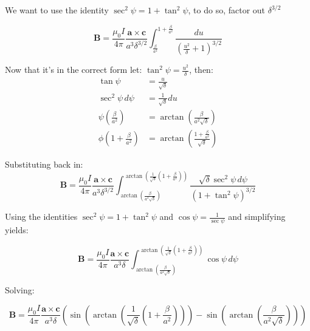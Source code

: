 We want to use the identity $\sec^2\psi = 1 + \tan^2\psi$, to do so, factor out $\delta^{3/2}$

\begin{equation}
  \mathbf{B} = \frac{\mu_0 I}{4\pi} \frac{\mathbf{a} \times \mathbf{c}}{a^3\delta^{3/2}} \int_{\frac{\beta}{a^2}}^{1+\frac{\beta}{a^2}} \frac{du}{\left(\frac{u^2}{\delta} + 1 \right)^{3/2}}
\end{equation}

Now that it's in the correct form let: $\tan^2\psi = \frac{u^2}{\delta}$, then: 
\begin{align*}
  \tan\psi &= \frac{u}{\sqrt{\delta}} \\
  \sec^2\psi \, d\psi &= \frac{1}{\sqrt{\delta}} du \\
  \psi\left(\frac{\beta}{a^2}\right) &= \arctan \left( \frac{\beta}{a^2\sqrt{\delta}} \right) \\
  \phi\left( 1 + \frac{\beta}{a^2} \right) &= \arctan \left( \frac{1+\frac{\beta}{a^2}}{\sqrt{\delta}} \right)
\end{align*}

Substituting back in:
\begin{equation}
  \mathbf{B} = \frac{\mu_0 I}{4\pi} \frac{\mathbf{a} \times \mathbf{c}}{a^3\delta^{3/2}} \int_{\arctan\left (\frac{\beta}{a^2\sqrt{\delta}}\right)}^{\arctan\left(\frac{1}{\sqrt{\delta}}\left(1+\frac{\beta}{a^2}\right)\right)} \frac{\sqrt{\delta} \sec^2 \psi \, d\psi}{\left(1 + \tan^2\psi \right)^{3/2}}
\end{equation}

Using the identities $\sec^2 \psi = 1 + \tan^2 \psi$ and $\cos \psi = \frac{1}{\sec \psi}$ and simplifying yields:

\begin{equation}
  \mathbf{B} = \frac{\mu_0 I}{4\pi} \frac{\mathbf{a} \times \mathbf{c}}{a^3\delta} \int_{\arctan\left (\frac{\beta}{a^2\sqrt{\delta}}\right)}^{\arctan\left(\frac{1}{\sqrt{\delta}}\left(1+\frac{\beta}{a^2}\right)\right)} \cos\psi \, d\psi
\end{equation}

Solving:

\begin{equation}
  \mathbf{B} = \frac{\mu_0 I}{4\pi} \frac{\mathbf{a} \times \mathbf{c}}{a^3\delta} \left ( \sin\left( \arctan\left(\frac{1}{\sqrt{\delta}}\left(1+\frac{\beta}{a^2}\right)\right)\right) - \sin \left( \arctan\left (\frac{\beta}{a^2\sqrt{\delta}}\right) \right) \right )
\end{equation}

